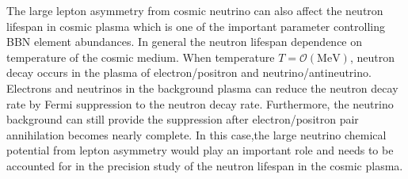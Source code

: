 The large lepton asymmetry from cosmic neutrino can also affect the neutron lifespan in cosmic plasma which is one of the important parameter controlling BBN element abundances. 
In general the neutron lifespan dependence on temperature of the cosmic medium. When temperature $T=\mathcal{O}(\mathrm{MeV})$, neutron decay occurs in the plasma of electron/positron and 
 neutrino/antineutrino. Electrons and neutrinos in the background plasma can reduce the neutron decay rate by Fermi suppression to the neutron decay rate. Furthermore, the neutrino background can still provide the suppression after electron/positron pair annihilation becomes nearly complete. In this case,the large neutrino chemical potential from lepton asymmetry would play an important role and needs to be accounted for in the precision study of the neutron lifespan in the cosmic plasma.
